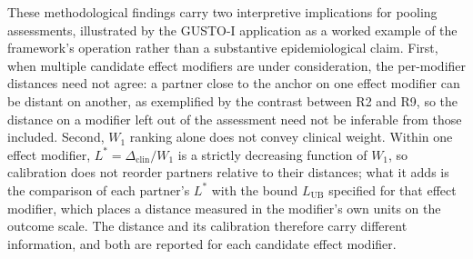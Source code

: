 \documentclass[AMA,Times1COL]{WileyNJDv5}
\begin{document}
These methodological findings carry two interpretive implications for pooling assessments, illustrated by the GUSTO-I application as a worked example of the framework's operation rather than a substantive epidemiological claim. First, when multiple candidate effect modifiers are under consideration, the per-modifier distances need not agree: a partner close to the anchor on one effect modifier can be distant on another, as exemplified by the contrast between R2 and R9, so the distance on a modifier left out of the assessment need not be inferable from those included. Second, $W_1$ ranking alone does not convey clinical weight. Within one effect modifier, $L^* = \Delta_{\text{clin}} / W_1$ is a strictly decreasing function of $W_1$, so calibration does not reorder partners relative to their distances; what it adds is the comparison of each partner's $L^*$ with the bound $L_{\text{UB}}$ specified for that effect modifier, which places a distance measured in the modifier's own units on the outcome scale. The distance and its calibration therefore carry different information, and both are reported for each candidate effect modifier.
\end{document}
